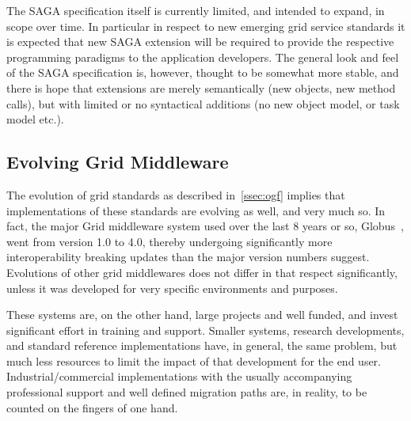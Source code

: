    The SAGA specification itself is currently limited, and
   intended to expand, in scope over time.  In particular in
   respect to new emerging grid service standards it is expected that
   new SAGA extension will be required to provide the respective 
   programming paradigms to the application developers.  The general
   look and feel of the SAGA specification is, however, thought to be
   somewhat more stable, and there is hope that extensions are merely
   semantically (new objects, new method calls), but with limited or
   no syntactical additions (no new object model, or task model etc.).
   


 \subsection{Evolving Grid Middleware}

   The evolution of grid standards as described in~\ref{ssec:ogf}
   implies that implementations of these standards are
   evolving as well, and very much so.  In fact, the major Grid
   middleware system used over the last 8 years or so,
   Globus~\cite{globus}, went from version 1.0 to 4.0, thereby
   undergoing significantly more interoperability breaking updates
   than the major version numbers suggest.  Evolutions of other grid
   middlewares does not differ in that respect significantly, unless it
   was developed for very specific environments and purposes.
   
   These systems are, on the other hand, large projects and well
   funded, and invest significant effort in training and support.
   Smaller systems, research developments, and standard reference
   implementations have, in general, the same problem, but much less
   resources to limit the impact of that development for the end user.
   Industrial/commercial implementations with the usually accompanying
   professional support and well defined migration paths are, in
   reality, to be counted on the fingers of one hand.



